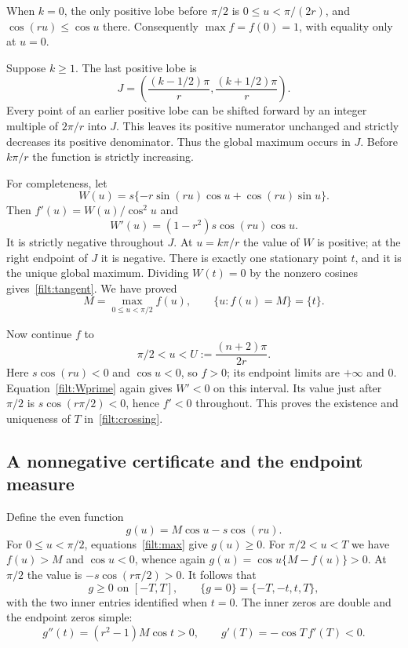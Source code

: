 When $k=0$, the only positive lobe before $\pi/2$ is
$0\le u<\pi/(2r)$, and $\cos(ru)\le\cos u$ there.  Consequently
$\max f=f(0)=1$, with equality only at $u=0$.

Suppose $k\ge1$.  The last positive lobe is
\[
 J=\left(\frac{(k-1/2)\pi}{r},
               \frac{(k+1/2)\pi}{r}\right).
\]
Every point of an earlier positive lobe can be shifted forward by an integer
multiple of $2\pi/r$ into $J$.  This leaves its positive numerator unchanged
and strictly decreases its positive denominator.  Thus the global maximum
occurs in $J$.  Before $k\pi/r$ the function is strictly increasing.

For completeness, let
\[
 W(u)=s\{-r\sin(ru)\cos u+\cos(ru)\sin u\}.
\]
Then $f'(u)=W(u)/\cos^2u$ and
\begin{equation}\label{filt:Wprime}
 W'(u)=(1-r^2)s\cos(ru)\cos u.
\end{equation}
It is strictly negative throughout $J$.  At $u=k\pi/r$ the value of $W$ is
positive; at the right endpoint of $J$ it is negative.  There is exactly one
stationary point $t$, and it is the unique global maximum.  Dividing
$W(t)=0$ by the nonzero cosines gives~\eqref{filt:tangent}.
We have proved
\begin{equation}\label{filt:max}
 M=\max_{0\le u<\pi/2}f(u),
 \qquad \{u:f(u)=M\}=\{t\}.
\end{equation}

Now continue $f$ to
\[
 \pi/2<u<U:=\frac{(n+2)\pi}{2r}.
\]
Here $s\cos(ru)<0$ and $\cos u<0$, so $f>0$; its endpoint limits are
$+\infty$ and $0$.  Equation~\eqref{filt:Wprime} again gives $W'<0$ on this
interval.  Its value just after $\pi/2$ is
$s\cos(r\pi/2)<0$, hence $f'<0$ throughout.  This proves the existence and
uniqueness of $T$ in~\eqref{filt:crossing}.

\subsection{A nonnegative certificate and the endpoint measure}

Define the even function
\begin{equation}\label{filt:g}
 g(u)=M\cos u-s\cos(ru).
\end{equation}
For $0\le u<\pi/2$, equations~\eqref{filt:max} give $g(u)\ge0$.
For $\pi/2<u<T$ we have $f(u)>M$ and $\cos u<0$, whence again
$g(u)=\cos u\{M-f(u)\}>0$.
At $\pi/2$ the value is $-s\cos(r\pi/2)>0$.
It follows that
\begin{equation}\label{filt:certzeros}
 g\ge0\text{ on }[-T,T],\qquad
 \{g=0\}=\{-T,-t,t,T\},
\end{equation}
with the two inner entries identified when $t=0$.
The inner zeros are double and the endpoint zeros simple:
\[
 g''(t)=(r^2-1)M\cos t>0,
 \qquad g'(T)=-\cos T\,f'(T)<0.
\]

